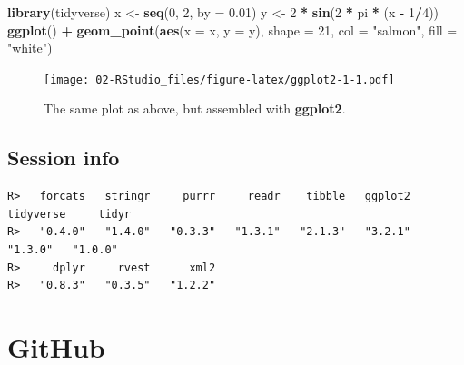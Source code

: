 \documentclass[
]{book}
\newenvironment{Shaded}{\begin{snugshade}}{\end{snugshade}}
\newcommand{\DataTypeTok}[1]{\textcolor[rgb]{0.13,0.29,0.53}{#1}}
\newcommand{\DecValTok}[1]{\textcolor[rgb]{0.00,0.00,0.81}{#1}}
\newcommand{\FloatTok}[1]{\textcolor[rgb]{0.00,0.00,0.81}{#1}}
\newcommand{\KeywordTok}[1]{\textcolor[rgb]{0.13,0.29,0.53}{\textbf{#1}}}
\newcommand{\NormalTok}[1]{#1}
\newcommand{\OperatorTok}[1]{\textcolor[rgb]{0.81,0.36,0.00}{\textbf{#1}}}
\newcommand{\StringTok}[1]{\textcolor[rgb]{0.31,0.60,0.02}{#1}}
\begin{document}
\begin{Shaded}
\begin{Highlighting}[]
\KeywordTok{library}\NormalTok{(tidyverse)}
\NormalTok{x <{-}}\StringTok{ }\KeywordTok{seq}\NormalTok{(}\DecValTok{0}\NormalTok{, }\DecValTok{2}\NormalTok{, }\DataTypeTok{by =} \FloatTok{0.01}\NormalTok{)}
\NormalTok{y <{-}}\StringTok{ }\DecValTok{2} \OperatorTok{*}\StringTok{ }\KeywordTok{sin}\NormalTok{(}\DecValTok{2} \OperatorTok{*}\StringTok{ }\NormalTok{pi }\OperatorTok{*}\StringTok{ }\NormalTok{(x }\OperatorTok{{-}}\StringTok{ }\DecValTok{1}\OperatorTok{/}\DecValTok{4}\NormalTok{))}
\KeywordTok{ggplot}\NormalTok{() }\OperatorTok{+}
\StringTok{  }\KeywordTok{geom\_point}\NormalTok{(}\KeywordTok{aes}\NormalTok{(}\DataTypeTok{x =}\NormalTok{ x, }\DataTypeTok{y =}\NormalTok{ y), }\DataTypeTok{shape =} \DecValTok{21}\NormalTok{, }\DataTypeTok{col =} \StringTok{"salmon"}\NormalTok{, }\DataTypeTok{fill =} \StringTok{"white"}\NormalTok{)}
\end{Highlighting}
\end{Shaded}

\begin{figure}
\centering
\texttt{[image: 02-RStudio\_files/figure-latex/ggplot2-1-1.pdf]}
\caption{\label{fig:ggplot2-1}The same plot as above, but assembled with \textbf{ggplot2}.}
\end{figure}

\hypertarget{session-info-1}{%
\section{Session info}\label{session-info-1}}

\begin{Shaded}
\end{Shaded}

\begin{verbatim}
R>   forcats   stringr     purrr     readr    tibble   ggplot2 tidyverse     tidyr 
R>   "0.4.0"   "1.4.0"   "0.3.3"   "1.3.1"   "2.1.3"   "3.2.1"   "1.3.0"   "1.0.0" 
R>     dplyr     rvest      xml2 
R>   "0.8.3"   "0.3.5"   "1.2.2"
\end{verbatim}

\hypertarget{github}{%
\chapter{GitHub}\label{github}}
\end{document}

